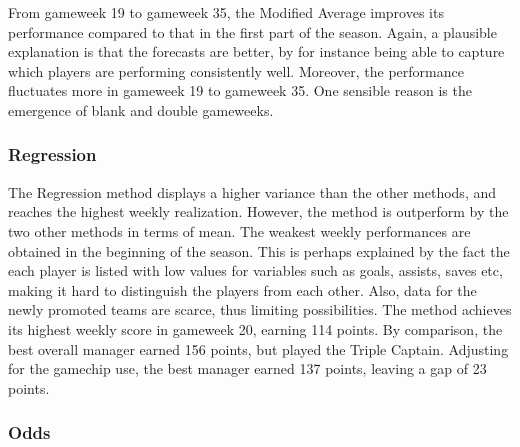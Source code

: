 \newpar

From gameweek 19 to gameweek 35, the Modified Average improves its performance compared to that in the first part of the season. Again, a plausible explanation is that the forecasts are better, by for instance being able to capture which players are performing consistently well. Moreover, the performance fluctuates more in gameweek 19 to gameweek 35. One sensible reason is the emergence of blank and double gameweeks. 


\subsubsection{Regression}

The Regression method displays a higher variance than the other methods, and reaches the highest weekly realization. However, the method is outperform by the two other methods in terms of mean. The weakest weekly performances are obtained in the beginning of the season. This is perhaps explained by the fact the each player is listed with low values for variables such as goals, assists,  saves etc, making it hard to distinguish the players from each other. Also, data for the newly promoted teams are scarce, thus limiting possibilities. The method achieves its highest weekly score in gameweek 20, earning 114 points. By comparison, the best overall manager earned 156 points, but played the Triple Captain. Adjusting for the gamechip use, the best manager earned 137 points, leaving a gap of 23 points.

\subsubsection{Odds}

